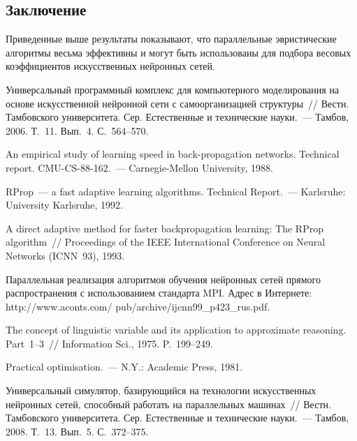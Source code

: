 \begin{multicols}{2}
\vspace*{-5pt}
\section{Заключение}

 Приведенные выше результаты показывают, что параллельные эвристические
алгоритмы весьма эффективны и могут быть использованы для подбора весовых
коэффициентов искусственных нейронных сетей.

\vspace*{-9pt}

{\small\frenchspacing
{\baselineskip=10pt
\begin{thebibliography}{99}


Универсальный программный комплекс для компьютерного моделирования на основе
искусственной нейронной сети с самоорганизацией структуры~// Вестн. Тамбовского
университета. Сер. Естественные и технические науки.~--- Тамбов, 2006. Т.~11. Вып.~4.
С.~564--570.

An empirical study of learning speed in back-propagation networks. Technical report.
CMU-CS-88-162.~--- Carnegie-Mellon University, 1988.

RProp~--- a fast adaptive learning algorithms. Technical Report.~--- Karlsruhe: University
Karlsruhe, 1992.

A direct adaptive method for faster backpropagation learning: The RProp algorithm~//
Proceedings of the IEEE International Conference on Neural Networks (ICNN~93), 1993.

Параллельная реализация алгоритмов обучения нейронных сетей прямого
распространения с использованием стандарта MPI. Адрес в Интернете: {\sf
http://www.aconts.com/ pub/archive/ijcnn99\_p423\_rus.pdf}.

The concept of linguistic variable and its application to approximate reasoning. Part~1--3~//
Information Sci., 1975. P.~199--249.

Practical optimisation.~--- N.Y.: Academic Press, 1981.

Универсальный симулятор, базирующийся на технологии искусственных нейронных
сетей, способный работать на параллельных машинах~// Вестн. Тамбовского
университета. Сер. Естественные и технические науки.~--- Тамбов, 2008. Т.~13. Вып.~5.
С.~372--375.


\end{thebibliography}}}
\end{multicols}
